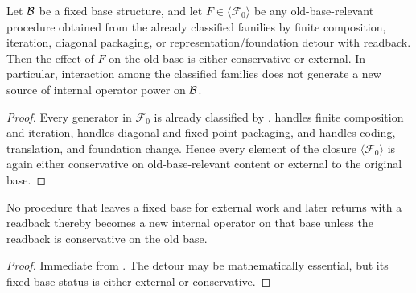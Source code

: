\begin{theorem}\label{thm:no-emergent-family}
Let $\mathcal{B}$ be a fixed base structure, and let $F\in\langle\mathcal{F}_0\rangle$ be any old-base-relevant procedure obtained from the already classified families by finite composition, iteration, diagonal packaging, or representation/foundation detour with readback. Then the effect of $F$ on the old base is either conservative or external. In particular, interaction among the classified families does not generate a new source of internal operator power on $\mathcal{B}$.
\end{theorem}

\begin{proof}
Every generator in $\mathcal{F}_0$ is already classified by .  handles finite composition and iteration,  handles diagonal and fixed-point packaging, and  handles coding, translation, and foundation change. Hence every element of the closure $\langle\mathcal{F}_0\rangle$ is again either conservative on old-base-relevant content or external to the original base.
\end{proof}

\begin{corollary}\label{cor:no-reentry}
No procedure that leaves a fixed base for external work and later returns with a readback thereby becomes a new internal operator on that base unless the readback is conservative on the old base.
\end{corollary}

\begin{proof}
Immediate from . The detour may be mathematically essential, but its fixed-base status is either external or conservative.
\end{proof}
